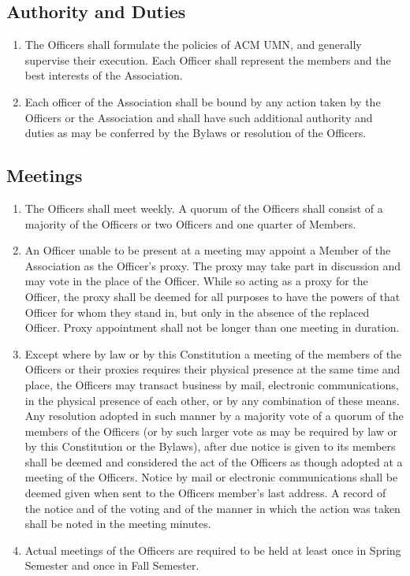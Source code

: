 \subsection{Authority and Duties}
\begin{enumerate}
	\item The Officers shall formulate the policies of ACM UMN, and generally supervise their execution. Each Officer shall represent the members and the best interests of the Association.
	\item Each officer of the Association shall be bound by any action taken by the Officers or the Association and shall have such additional authority and duties as may be conferred by the Bylaws or resolution of the Officers.
\end{enumerate}

\subsection{Meetings}
\begin{enumerate}
	\item The Officers shall meet weekly. A quorum of the Officers shall consist of a majority of the Officers or two Officers and one quarter of Members.
	\item An Officer unable to be present at a meeting may appoint a Member of the Association as the Officer’s proxy. The proxy may take part in discussion and may vote in the place of the Officer. While so acting as a proxy for the Officer, the proxy shall be deemed for all purposes to have the powers of that Officer for whom they stand in, but only in the absence of the replaced Officer. Proxy appointment shall not be longer than one meeting in duration.
	\item Except where by law or by this Constitution a meeting of the members of the Officers or their proxies requires their physical presence at the same time and place, the Officers may transact business by mail, electronic communications, in the physical presence of each other, or by any combination of these means. Any resolution adopted in such manner by a majority vote of a quorum of the members of the Officers (or by such larger vote as may be required by law or by this Constitution or the Bylaws), after due notice is given to its members shall be deemed and considered the act of the Officers as though adopted at a meeting of the Officers. Notice by mail or electronic communications shall be deemed given when sent to the Officers member's last address. A record of the notice and of the voting and of the manner in which the action was taken shall be noted in the meeting minutes.
	\item Actual meetings of the Officers are required to be held at least once in Spring Semester and once in Fall Semester.
\end{enumerate}

